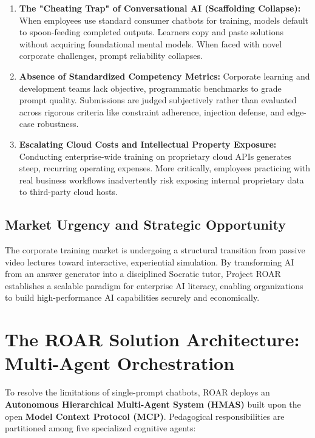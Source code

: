 \documentclass[11pt,a4paper]{article}
\begin{document}
\begin{enumerate}[leftmargin=1.4em, itemsep=3pt]
  \item \textbf{The "Cheating Trap" of Conversational AI (Scaffolding Collapse):} When employees use standard consumer chatbots for training, models default to spoon-feeding completed outputs. Learners copy and paste solutions without acquiring foundational mental models. When faced with novel corporate challenges, prompt reliability collapses.
  \item \textbf{Absence of Standardized Competency Metrics:} Corporate learning and development teams lack objective, programmatic benchmarks to grade prompt quality. Submissions are judged subjectively rather than evaluated across rigorous criteria like constraint adherence, injection defense, and edge-case robustness.
  \item \textbf{Escalating Cloud Costs and Intellectual Property Exposure:} Conducting enterprise-wide training on proprietary cloud APIs generates steep, recurring operating expenses. More critically, employees practicing with real business workflows inadvertently risk exposing internal proprietary data to third-party cloud hosts.
\end{enumerate}

\subsection{Market Urgency and Strategic Opportunity}
The corporate training market is undergoing a structural transition from passive video lectures toward interactive, experiential simulation. By transforming AI from an answer generator into a disciplined Socratic tutor, Project ROAR establishes a scalable paradigm for enterprise AI literacy, enabling organizations to build high-performance AI capabilities securely and economically.

\newpage


\section{The ROAR Solution Architecture: Multi-Agent Orchestration}

To resolve the limitations of single-prompt chatbots, ROAR deploys an \textbf{Autonomous Hierarchical Multi-Agent System (HMAS)} built upon the open \textbf{Model Context Protocol (MCP)}. Pedagogical responsibilities are partitioned among five specialized cognitive agents:
\end{document}
